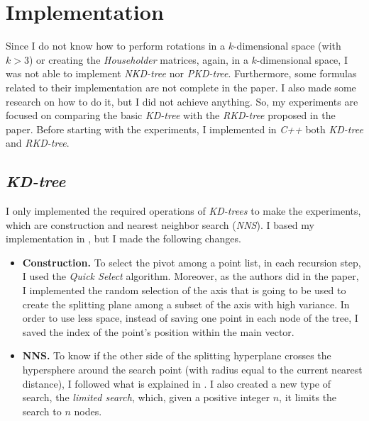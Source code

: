 \section{Implementation}

Since I do not know how to perform rotations in a $k$-dimensional space (with $k > 3$) or creating the \textit{Householder} matrices, again, in a $k$-dimensional space, I was not able to implement \textit{NKD-tree} nor \textit{PKD-tree}. Furthermore, some formulas related to their implementation are not complete in the paper. I also made some research on how to do it, but I did not achieve anything. So, my experiments are focused on comparing the basic \textit{KD-tree} with the \textit{RKD-tree} proposed in the paper. Before starting with the experiments, I implemented in \textit{C++} both \textit{KD-tree} and \textit{RKD-tree}.

\subsection{\textit{KD-tree}}
I only implemented the required operations of \textit{KD-trees} to make the experiments, which are construction and nearest neighbor search (\textit{NNS}). I based my implementation in \cite{wiki}, but I made the following changes.
\begin{itemize}
    \item \textbf{Construction.} To select the pivot among a point list, in each recursion step, I used the \textit{Quick Select} algorithm. Moreover, as the authors did in the paper, I implemented the random selection of the axis that is going to be used to create the splitting plane among a subset of the axis with high variance. In order to use less space, instead of saving one point in each node of the tree, I saved the index of the point's position within the main vector.
    \item \textbf{NNS.} To know if the other side of the splitting hyperplane crosses the hypersphere around the search point (with radius equal to the current nearest distance), I followed what is explained in \cite{nns}. I also created a new type of search, the \textit{limited search}, which, given a positive integer $n$, it limits the search to $n$ nodes.
\end{itemize}


